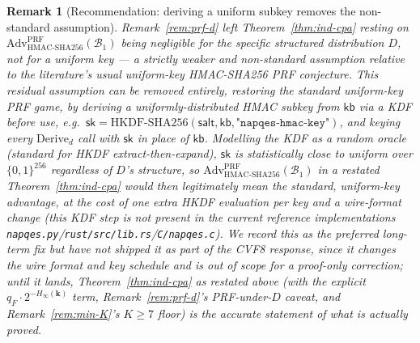\documentclass[11pt,a4paper]{article}
\newtheorem{remark}[theorem]{Remark}
\begin{document}
\begin{remark}[Recommendation: deriving a uniform subkey removes the non-standard assumption]
\label{rem:cvf8-kdf}
Remark~\ref{rem:prf-d} left Theorem~\ref{thm:ind-cpa} resting on
$\mathrm{Adv}^{\mathrm{PRF}}_{\mathrm{HMAC\text{-}SHA256}}(\mathcal{B}_1)$
being negligible \emph{for the specific structured distribution $D$}, not
for a uniform key --- a strictly weaker and non-standard assumption
relative to the literature's usual uniform-key HMAC-SHA256 PRF conjecture.
This residual assumption can be removed entirely, restoring the standard
uniform-key PRF game, by deriving a uniformly-distributed HMAC subkey from
$\mathsf{kb}$ via a KDF before use, e.g.\
$\mathsf{sk} = \mathrm{HKDF\text{-}SHA256}(\mathsf{salt}, \mathsf{kb}, \texttt{"napqes-hmac-key"})$,
and keying every $\mathrm{Derive}_d$ call with $\mathsf{sk}$ in place of
$\mathsf{kb}$. Modelling the KDF as a random oracle (standard for HKDF
extract-then-expand), $\mathsf{sk}$ is statistically close to uniform over
$\{0,1\}^{256}$ regardless of $D$'s structure, so
$\mathrm{Adv}^{\mathrm{PRF}}_{\mathrm{HMAC\text{-}SHA256}}(\mathcal{B}_1)$
in a restated Theorem~\ref{thm:ind-cpa} would then legitimately mean the
standard, uniform-key advantage, at the cost of one extra HKDF evaluation
per key and a wire-format change (this KDF step is not present in the
current reference implementations \texttt{napqes.py}/\texttt{rust/src/lib.rs}/\texttt{C/napqes.c}).
We record this as the preferred long-term fix but have \emph{not} shipped
it as part of the CVF8 response, since it changes the wire format and key
schedule and is out of scope for a proof-only correction; until it lands,
Theorem~\ref{thm:ind-cpa} as restated above (with the explicit
$q_F\cdot2^{-H_\infty(\mathbf{k})}$ term, Remark~\ref{rem:prf-d}'s
PRF-under-$D$ caveat, and Remark~\ref{rem:min-K}'s $K\geq7$ floor) is the
accurate statement of what is actually proved.
\end{remark}
\end{document}

